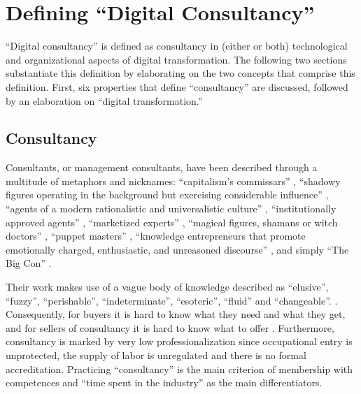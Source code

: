 \documentclass[12pt]{article}
\begin{document}
\hypertarget{defining-digital-consultancy}{%
\section{Defining ``Digital
Consultancy''}\label{defining-digital-consultancy}}

``Digital consultancy'' is defined as consultancy in (either or both)
technological and organizational aspects of digital transformation. The
following two sections substantiate this definition by elaborating on
the two concepts that comprise this definition. First, six properties
that define ``consultancy'' are discussed, followed by an elaboration on
``digital transformation.''

\hypertarget{consultancy}{%
\subsection{Consultancy}\label{consultancy}}

Consultants, or management consultants, have been described through a
multitude of metaphors and nicknames: ``capitalism's commissars''
\citep[ 93]{thrift2005}, ``shadowy figures operating in the background
but exercising considerable influence'' \citep[ 31]{kipping2012},
``agents of a modern rationalistic and universalistic culture'' \citep[
190]{kipping2012}, ``institutionally approved agents'' \citep[
193]{kipping2012}, ``marketized experts'' \citep[ 265]{furusten2012},
``magical figures, shamans or witch doctors'' \citep[ 68]{fincham2002},
``puppet masters'' \citep[ 69]{fincham2002}, ``knowledge entrepreneurs
that promote emotionally charged, enthusiastic, and unreasoned
discourse'' \citep[ 37]{leicht2006}, and simply ``The Big Con''
\citep{mazzucato2023}.

Their work makes use of a vague body of knowledge described as
``elusive'', ``fuzzy'', ``perishable'', ``indeterminate'', ``esoteric'',
``fluid'' and ``changeable''. \citep{muzio2011}. Consequently, for
buyers it is hard to know what they need and what they get, and for
sellers of consultancy it is hard to know what to offer \citep[
266]{furusten2012}. Furthermore, consultancy is marked by very low
professionalization since occupational entry is unprotected, the supply
of labor is unregulated and there is no formal accreditation. \citep[
20]{fincham2006} Practicing ``consultancy'' is the main criterion of
membership with competences and ``time spent in the industry'' as the
main differentiators.
\end{document}
